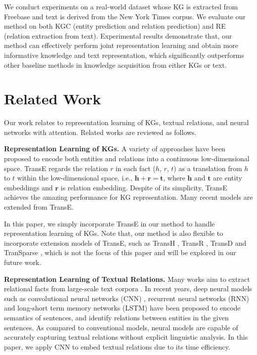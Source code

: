 \documentclass[11pt,a4paper]{article}
\begin{document}
We conduct experiments on a real-world dataset whose KG is extracted from Freebase and text is derived from the New York Times corpus. We evaluate our method on both KGC (entity prediction and relation prediction) and RE (relation extraction from text). Experimental results demonstrate that, our method can effectively perform joint representation learning and obtain more informative knowledge and text representation, which significantly outperforms other baseline methods in knowledge acquisition from either KGs or text.

\section{Related Work}
\label{sec:related}
Our work relates to representation learning of KGs, textual relations, and neural networks with attention. Related works are reviewed as follows.

\textbf{Representation Learning of KGs.} A variety of approaches have been proposed to encode both entities and relations into a continuous low-dimensional space. TransE \cite{bordes2013translating} regards the relation $r$ in each fact ($h$, $r$, $t$) as a translation from $h$ to $t$ within the low-dimensional space, i.e., $\textbf{h} + \textbf{r} = \textbf{t}$, where $\textbf{h}$ and $\textbf{t}$ are entity embeddings and $\textbf{r}$ is relation embedding. Despite of its simplicity, TransE achieves the amazing performance for KG representation. Many recent models are extended from TransE.

In this paper, we simply incorporate TransE in our method to handle representation learning of KGs. Note that, our method is also flexible to incorporate extension models of TransE, such as TransH \cite{wang2014transh}, TransR \cite{lin2015learning}, TransD \cite{ji2015knowledge} and TranSparse \cite{ji2016knowledge}, which is not the focus of this paper and will be explored in our future work.


\textbf{Representation Learning of Textual Relations.} Many works aim to extract relational facts from large-scale text corpora \cite{mintz2009distant,riedel2010modeling}. In recent years, deep neural models such as convolutional neural networks (CNN) \cite{zeng2014relation,zeng2015distant,lin2016neural}, recurrent neural networks (RNN) \cite{zhang2015relation} and long-short term memory networks (LSTM) \cite{xu2015classifying,miwa2016end} have been proposed to encode semantics of sentences, and identify relations between entities in the given sentences. As compared to conventional models, neural models are capable of accurately capturing textual relations without explicit linguistic analysis. In this paper, we apply CNN to embed textual relations due to its time efficiency.
\end{document}
